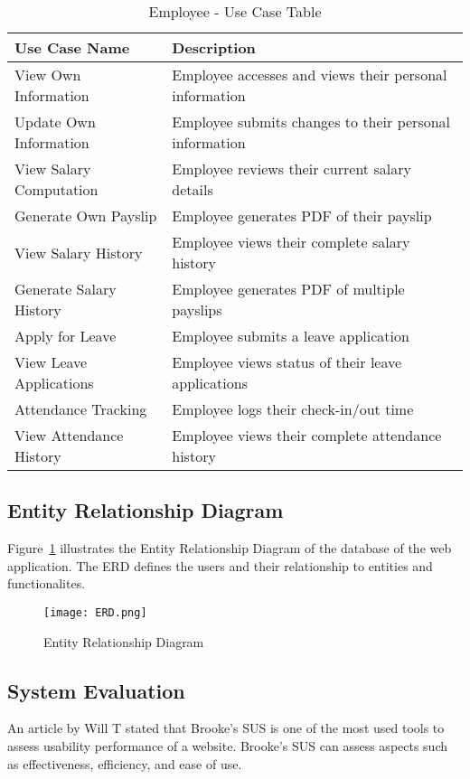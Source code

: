 \documentclass[journal]{./IEEE/IEEEtran}
\begin{document}
\begin{table}[H]
\centering
\caption{Employee - Use Case Table}
\label{tab:employee-usecase}
\begin{tabular}{|p{}|p{}|}
\hline
\textbf{Use Case Name} & \textbf{Description} \\
\hline
View Own Information & Employee accesses and views their personal information \\
\hline
Update Own Information & Employee submits changes to their personal information \\
\hline
View Salary Computation & Employee reviews their current salary details \\
\hline
Generate Own Payslip & Employee generates PDF of their payslip \\
\hline
View Salary History & Employee views their complete salary history \\
\hline
Generate Salary History & Employee generates PDF of multiple payslips \\
\hline
Apply for Leave & Employee submits a leave application \\
\hline
View Leave Applications & Employee views status of their leave applications \\
\hline
Attendance Tracking & Employee logs their check-in/out time \\
\hline
View Attendance History & Employee views their complete attendance history \\
\hline
\end{tabular}
\end{table}
\subsection{\textbf{Entity Relationship Diagram}}

Figure~\ref{fig:erd} illustrates the Entity Relationship Diagram of the database of the web application. The ERD defines the users and their relationship to entities and functionalites.

\begin{figure}[htbp]
    \centering
    \texttt{[image: ERD.png]}
    \caption{Entity Relationship Diagram}
    \label{fig:erd}
\end{figure}
\subsection{\textbf{System Evaluation}}

An article by Will T stated that Brooke’s SUS is one of the most used tools to assess usability performance of a website. Brooke’s SUS can assess aspects such as effectiveness, efficiency, and ease of use.
\end{document}
